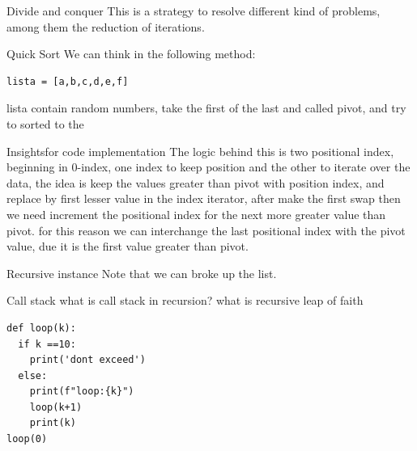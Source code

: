 \documentclass{beamer}
\begin{document}
\begin{frame}[fragile]{Divide and conquer}
This is a strategy to resolve different kind of problems, among them the reduction of iterations.
\end{frame}

\begin{frame}[fragile]{Quick Sort}
We can think in the following method:
\begin{verbatim}
lista = [a,b,c,d,e,f]
\end{verbatim}
lista contain random numbers, take the first of the last and called pivot, and try to sorted to the 

\end{frame}

\begin{frame}[fragile]{Insights}{for code implementation}
The logic behind this is two positional index, 
beginning in 0-index, one index to keep position and the other to iterate over the data,  the idea is keep the values  greater than pivot with position index, and replace by first lesser value in the index iterator, after make the first swap then we need increment the positional index for the next more greater value than pivot.
for this reason we can interchange the last positional index with the pivot value, due it is the first value greater than pivot.
\end{frame}


\begin{frame}[fragile]{Recursive instance}
Note that we can broke up the list. 

\end{frame}



\begin{frame}{Call stack}
what is call stack in recursion?
what is recursive leap of faith

\end{frame}


\begin{frame}[fragile]
\begin{lstlisting}
def loop(k):
  if k ==10:
    print('dont exceed')
  else:
    print(f"loop:{k}")
    loop(k+1)
    print(k)
loop(0)
\end{lstlisting}
\end{frame}

\end{document}
